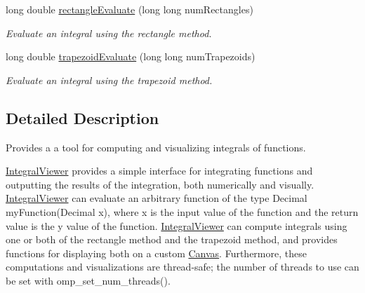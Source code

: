 \begin{DoxyCompactItemize}
long double \hyperlink{classtsgl_1_1_integral_viewer_a213d814ac293686ecd06c45344fa242f}{rectangle\-Evaluate} (long long num\-Rectangles)
\begin{DoxyCompactList}\small\item\em Evaluate an integral using the rectangle method. \end{DoxyCompactList}\item 
long double \hyperlink{classtsgl_1_1_integral_viewer_a485bd58c87267460baf013cdf786eae7}{trapezoid\-Evaluate} (long long num\-Trapezoids)
\begin{DoxyCompactList}\small\item\em Evaluate an integral using the trapezoid method. \end{DoxyCompactList}\end{DoxyCompactItemize}


\subsection{Detailed Description}
Provides a a tool for computing and visualizing integrals of functions. 

\hyperlink{classtsgl_1_1_integral_viewer}{Integral\-Viewer} provides a simple interface for integrating functions and outputting the results of the integration, both numerically and visually. \hyperlink{classtsgl_1_1_integral_viewer}{Integral\-Viewer} can evaluate an arbitrary function of the type {\ttfamily Decimal my\-Function(\-Decimal x)}, where x is the input value of the function and the return value is the y value of the function. \hyperlink{classtsgl_1_1_integral_viewer}{Integral\-Viewer} can compute integrals using one or both of the rectangle method and the trapezoid method, and provides functions for displaying both on a custom \hyperlink{classtsgl_1_1_canvas}{Canvas}. Furthermore, these computations and visualizations are thread-\/safe; the number of threads to use can be set with {\ttfamily omp\-\_\-set\-\_\-num\-\_\-threads()}. 

